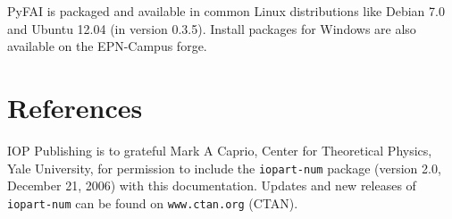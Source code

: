 \documentclass[a4paper]{jpconf}
\begin{document}
PyFAI is packaged and available in common Linux distributions like Debian
7.0 and Ubuntu 12.04 (in version 0.3.5). Install packages for Windows are also
available on the EPN-Campus forge.

 \section*{References}
\begin{thebibliography}{9}
 IOP Publishing is to grateful Mark A Caprio, Center for Theoretical Physics, Yale University, for permission to include the {\tt iopart-num} \BibTeX package (version 2.0, December 21, 2006) with  this documentation. Updates and new releases of {\tt iopart-num} can be found on \verb"www.ctan.org" (CTAN). 
\end{thebibliography}
\end{document}
